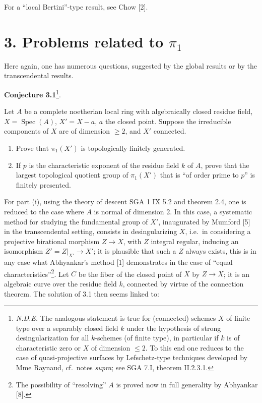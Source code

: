 \documentclass[
  11pt,
  a4paper,
]{book}
\begin{document}
For a ``local Bertini''-type result, see Chow {[}2{]}.

\section{\texorpdfstring{3. Problems related to
\(\pi_{1}\)}{3. Problems related to \textbackslash pi\_\{1\}}}\label{problems-related-to-pi_1}

Here again, one has numerous questions, suggested by the global results
or by the transcendental results.

\textbf{Conjecture 3.1}\footnote{\emph{N.D.E.} The analogous statement
  is true for (connected) schemes \(X\) of finite type over a separably
  closed field \(k\) under the hypothesis of strong desingularization
  for all \(k\)-schemes (of finite type), in particular if \(k\) is of
  characteristic zero or \(X\) of dimension \(\leqslant 2\). To this end
  one reduces to the case of quasi-projective surfaces by Lefschetz-type
  techniques developed by Mme Raynaud, cf.~notes \emph{supra}; see SGA
  7.I, theorem II.2.3.1.}.

Let \(A\) be a complete noetherian local ring with algebraically closed
residue field, \(X = \operatorname{Spec}(A)\), \(X' =
X - {a}\), \(a\) the closed point. Suppose the irreducible components of
\(X\) are of dimension \(\geqslant 2\), and \(X'\) connected.

\begin{enumerate}
\def\labelenumi{(\roman{enumi})}
\item
  Prove that \(\pi_{1}(X')\) is topologically finitely generated.
\item
  If \(p\) is the characteristic exponent of the residue field \(k\) of
  \(A\), prove that the largest topological quotient group of
  \(\pi_{1}(X')\) that is ``of order prime to \(p\)'' is finitely
  presented.
\end{enumerate}

For part (i), using the theory of descent SGA 1 IX 5.2 and theorem 2.4,
one is reduced to the case where \(A\) is normal of dimension 2. In this
case, a systematic method for studying the fundamental group of \(X'\),
inaugurated by Mumford {[}5{]} in the transcendental setting, consists
in desingularizing \(X\), i.e.~in considering a projective birational
morphism \(Z
\to X\), with \(Z\) integral regular, inducing an isomorphism
\(Z' = Z|_{X'} \to X'\); it is plausible that such a \(Z\) always
exists, this is in any case what Abhyankar's method {[}1{]} demonstrates
in the case of ``equal characteristics''\footnote{The possibility of
  ``resolving'' \(A\) is proved now in full generality by Abhyankar
  {[}8{]}.}. Let \(C\) be the fiber of the closed point of \(X\) by
\(Z \to X\); it is an algebraic curve over the residue field \(k\),
connected by virtue of the connection theorem. The solution of 3.1 then
seems linked to:
\end{document}
